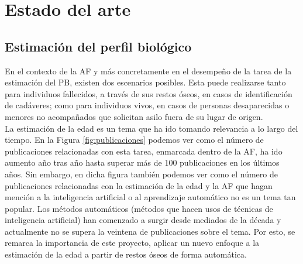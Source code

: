 \chapter{Estado del arte}
\label{chap:estadodelarte}

\section{Estimación del perfil biológico}

En el contexto de la AF y más concretamente en el desempeño de la tarea de la estimación del PB, existen dos escenarios posibles. Esta puede realizarse tanto para individuos fallecidos, a través de sus restos óseos, en casos de identificación de cadáveres; como para individuos vivos, en casos de personas desaparecidas o menores no acompañados que solicitan asilo fuera de su lugar de origen.\\

La estimación de la edad es un tema que ha ido tomando relevancia a lo largo del tiempo. En la Figura \ref{fig:publicaciones} podemos ver como el número de publicaciones relacionadas con esta tarea, enmarcada dentro de la AF, ha ido aumento año tras año hasta superar más de 100 publicaciones en los últimos años. Sin embargo, en dicha figura también podemos ver como el número de publicaciones relacionadas con la estimación de la edad y la AF que hagan mención a la inteligencia artificial o al aprendizaje automático no es un tema tan popular. Los métodos automáticos (métodos que hacen usos de técnicas de inteligencia artificial) han comenzado a surgir desde mediados de la década y actualmente no se supera la veintena de publicaciones sobre el tema. Por esto, se remarca la importancia de este proyecto, aplicar un nuevo enfoque a la estimación de la edad a partir de restos óseos de forma automática.\\

